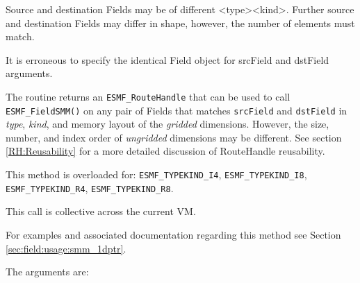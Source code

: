    Source and destination Fields may be of different <type><kind>. Further source 
   and destination Fields may differ in shape, however, the number of elements 
   must match. 
    
   It is erroneous to specify the identical Field object for srcField and dstField 
   arguments.
  
     The routine returns an {\tt ESMF\_RouteHandle} that can be used to call 
     {\tt ESMF\_FieldSMM()} on any pair of Fields that matches 
     {\tt srcField} and {\tt dstField} in {\em type}, {\em kind}, and 
     memory layout of the {\em gridded} dimensions. However, the size, number, 
     and index order of {\em ungridded} dimensions may be different. See section
     \ref{RH:Reusability} for a more detailed discussion of RouteHandle 
     reusability.
    
   This method is overloaded for:\newline
   {\tt ESMF\_TYPEKIND\_I4}, {\tt ESMF\_TYPEKIND\_I8},\newline 
   {\tt ESMF\_TYPEKIND\_R4}, {\tt ESMF\_TYPEKIND\_R8}.
   \newline
    
   This call is collective across the current VM.  
   
   For examples and associated documentation regarding this method see Section
   \ref{sec:field:usage:smm_1dptr}. 
   
   The arguments are:
  
